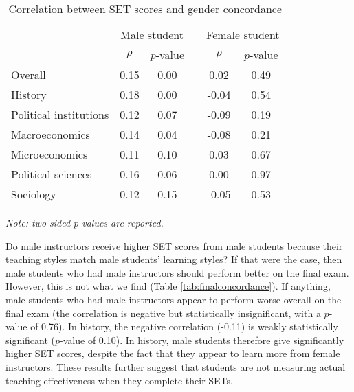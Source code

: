 \documentclass[12pt]{article}
\begin{document}
\begin{table}[htbp]
  \centering
  \footnotesize 
  \caption{Correlation between SET scores and gender concordance}
    \begin{tabular}{lccccc}
    \toprule 
          & \multicolumn{2}{c}{Male student}  &  & \multicolumn{2}{c}{Female student} \\
      & $\rho$  &  $p$-value &  & $\rho$  &  $p$-value    \\
   \midrule
      \quad  Overall &                 0.15       & 0.00 & &  0.02       & 0.49      \\
      \quad  History &                 0.18       & 0.00 & & -0.04       & 0.54      \\
      \quad  Political institutions &  0.12       & 0.07 & & -0.09       & 0.19       \\
      \quad  Macroeconomics &          0.14       & 0.04 & & -0.08       & 0.21     \\
      \quad  Microeconomics &          0.11       & 0.10 & &  0.03       & 0.67       \\
      \quad  Political sciences &      0.16       & 0.06 & &  0.00       & 0.97      \\
      \quad  Sociology &               0.12       & 0.15 & & -0.05       & 0.53      \\
    \bottomrule
    \end{tabular}%
 \label{tab:genderconcordance}%
  
  \textit{Note: two-sided $p$-values are reported.}
\end{table}%
\normalsize




Do male instructors receive higher SET scores from male students because their teaching styles match male students' learning styles? If that were the case, then male students who had male instructors should perform better on the final exam. However, this is not what we find (Table \ref{tab:finalconcordance}). If anything, male students who had male instructors appear to perform worse overall on the final exam (the correlation is negative but statistically insignificant, with a $p$-value of 0.76). In history, the negative correlation (-0.11) is weakly statistically significant ($p$-value of 0.10). In history, male students therefore give significantly higher SET scores, despite the fact that they appear to learn more from female instructors. These results further suggest that students are not measuring actual teaching effectiveness when they complete their SETs. 
\end{document}
